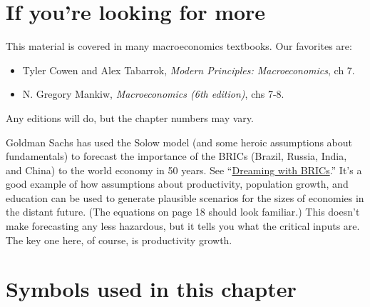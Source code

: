 \begin{enumerate}

\end{enumerate}
\setlength{\leftmargini}{\oldleftmargini}

\section*{If you're looking for more}

This material is covered in many macroeconomics textbooks.
Our favorites are:
\begin{itemize}
\item Tyler Cowen and Alex Tabarrok,
{\it Modern Principles: Macroeconomics\/}, ch 7.
\item N. Gregory Mankiw, {\it Macroeconomics (6th edition)\/}, chs 7-8.
\end{itemize}
Any editions will do, but the chapter numbers may vary.


Goldman Sachs has used the Solow model
(and some heroic assumptions about fundamentals) to forecast the importance of
the BRICs (Brazil, Russia, India, and China)
to the world economy in 50 years.
See
``\href{http://www.goldmansachs.com/our-thinking/topics/brics/brics-reports-pdfs/brics-dream.pdf}
{Dreaming with BRICs}.''
It's a good example of how assumptions about productivity, population growth, and education can be used to generate plausible scenarios for the sizes of economies in the distant future.
(The equations on page 18 should look familiar.)
This doesn't make forecasting any less hazardous, but it tells you
what the critical inputs are.
The key one here, of course, is productivity growth.

\section*{Symbols used in this chapter}

